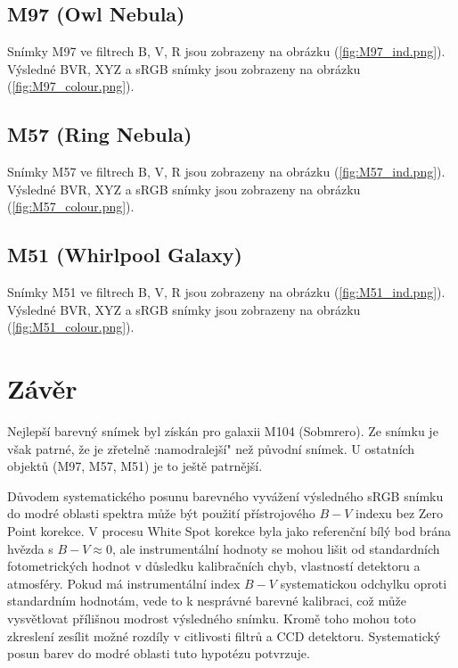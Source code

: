 \documentclass[a4paper,11pt,twocolumn]{article}
\begin{document}
        \subsection{M97 (Owl Nebula)}
            Snímky M97 ve filtrech B, V, R jsou zobrazeny na obrázku (\ref{fig:M97_ind.png}). Výsledné BVR, XYZ a sRGB snímky jsou zobrazeny na obrázku (\ref{fig:M97_colour.png}).
            
        \subsection{M57 (Ring Nebula)}
            Snímky M57 ve filtrech B, V, R jsou zobrazeny na obrázku (\ref{fig:M57_ind.png}). Výsledné BVR, XYZ a sRGB snímky jsou zobrazeny na obrázku (\ref{fig:M57_colour.png}).
            
        \subsection{M51 (Whirlpool Galaxy)}
            Snímky M51 ve filtrech B, V, R jsou zobrazeny na obrázku (\ref{fig:M51_ind.png}). Výsledné BVR, XYZ a sRGB snímky jsou zobrazeny na obrázku (\ref{fig:M51_colour.png}).

    \section{Závěr}
        Nejlepší barevný snímek byl získán pro galaxii M104 (Sobmrero). Ze snímku je však patrné, že je zřetelně :namodralejší" než původní snímek. U ostatních objektů (M97, M57, M51) je to ještě patrnější. 
            
        Důvodem systematického posunu barevného vyvážení výsledného sRGB snímku do modré oblasti spektra může být použití přístrojového $B-V$ indexu bez Zero Point korekce. V procesu White Spot korekce byla jako referenční bílý bod brána hvězda s $B-V \approx 0$, ale instrumentální hodnoty se mohou lišit od standardních fotometrických hodnot v důsledku kalibračních chyb, vlastností detektoru a atmosféry. Pokud má instrumentální index $B-V$ systematickou odchylku oproti standardním hodnotám, vede to k nesprávné barevné kalibraci, což může vysvětlovat přílišnou modrost výsledného snímku. Kromě toho mohou toto zkreslení zesílit možné rozdíly v citlivosti filtrů a CCD detektoru. Systematický posun barev do modré oblasti tuto hypotézu potvrzuje.

    
    
\end{document}
